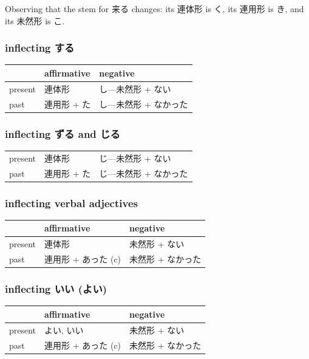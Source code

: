 \documentclass[11pt, b5paper, twoside, openright, onecolumn]{book}
\newenvironment{mytabular}[1]{\noindent\hspace{0.4in}
\begin{tabular}[h]{#1}}{\end{tabular}}
\begin{document}
Observing that the stem for 来る changes: its 連体形 is く‚ its 連用形 is き‚ and its 未然形 is こ.


\subsubsection{inflecting する}

\smaller
\begin{mytabular}{| l  l  l |}\hline 
\rule{0pt}{2.4ex} & affirmative & negative\\ 
\hline
\rule{0pt}{2.4ex}present & 連体形 & し—未然形 + ない\\ 
\rule{0pt}{2.4ex}past & 連用形 + た & し—未然形 + なかった\\ 
\hline 
\end{mytabular}
\larger

\subsubsection{inflecting ずる and じる}

\smaller
\begin{mytabular}{| l  l  l |}\hline 
\rule{0pt}{2.4ex}present & 連体形 & じ—未然形 + ない\\ 
\rule{0pt}{2.4ex}past & 連用形 + た & じ—未然形 + なかった\\ 
\hline 
\end{mytabular}
\larger

\subsubsection{inflecting verbal adjectives}

\smaller
\begin{mytabular}{| l  l  l |}\hline 
\rule{0pt}{2.4ex} & affirmative & negative\\ 
\hline
\rule{0pt}{2.4ex}present & 連体形 & 未然形 + ない\\ 
\rule{0pt}{2.4ex}past & 連用形 + あった (c) & 未然形 + なかった\\ 
\hline 
\end{mytabular}
\larger

\subsubsection{inflecting いい (よい)}

\smaller
\begin{mytabular}{| l  l  l |}\hline 
\rule{0pt}{2.4ex} & affirmative & negative\\ 
\hline
\rule{0pt}{2.4ex}present & よい‚ いい & 未然形 + ない\\ 
\rule{0pt}{2.4ex}past & 連用形 + あった (c) & 未然形 + なかった\\ 
\hline 
\end{mytabular}
\larger
\vspace{0.5cm}
\end{document}
